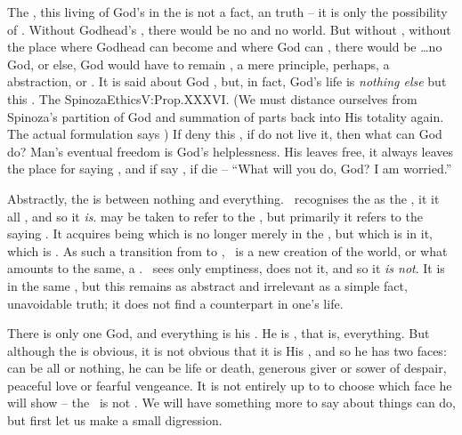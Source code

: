 %
The , this living  of God's in the
 is not a fact, an  truth -- it is only the possibility
of \yes.  Without Godhead's , there would be no  and no
world.  But without , without the place where Godhead can become
 and where God can , there would be \ldots no God, or
else, God would have to remain , a mere principle, perhaps, a
 abstraction,  or .
It is said about God , but, in
fact, God's life is {\em nothing else} but this .  The
\citet{intellectual love of the mind toward God is the love with which God loves
  Himself.}{SpinozaEthics}{V:Prop.XXXVI. (We must distance ourselves from
  Spinoza's partition of God and summation of parts back into His totality
  again. The actual formulation says )}  If  deny this , if  do not live it,
then what can God do?  Man's eventual freedom is God's helplessness. His
 leaves  free, it always leaves the place for saying \No, and
if  say \No, if  die -- ``What will you do, God?  I am worried.''

\pa\label{pa:twoFaces} Abstractly, the  is between nothing and
everything. \Yes\ recognises the  as the , it
 it  all , and so it {\em is}.
 may be taken to refer to the , but primarily it refers to the
 saying \yes.  It acquires being which is no longer merely
 in the , but which is 
in it, which is .  As such a transition from  to
, \yes\ is a new creation of the world, or what amounts to the
same, a .  \No\ sees only emptiness, does not 
it, and so it {\em is not}.  It is  in the same
, but this  remains as abstract and irrelevant as a
simple fact, unavoidable truth; it does not find a  counterpart in
one's life.

There is only one God, and everything is his .  He is
, that is, everything. But although the  
 is obvious, it is not obvious that it is His , and so
he has two faces:  can be all or nothing, he can be life or
death, generous giver or sower of despair, peaceful love or 
fearful vengeance. It is not entirely up to  to choose which face he
will show -- the \sch\ is not . We will have something more to say 
about things  can do, but first let us make a small digression.


